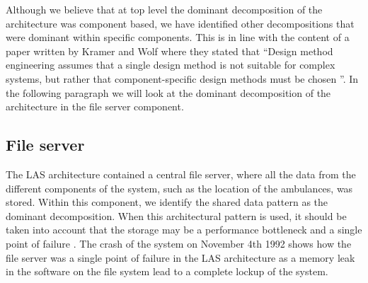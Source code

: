 Although we believe that at top level the dominant decomposition of the architecture was component based,
we have identified other decompositions that were dominant within specific components.
This is in line with the content of a paper written by Kramer and Wolf where they stated that
``Design method engineering assumes that a single design method is not suitable for complex systems,
but rather that component-specific design methods must be chosen ''\autocite[26]{kramer1996succeedings}.
In the following paragraph we will look at the dominant decomposition of the architecture in the file server component.

\subsection*{File server}

The LAS architecture contained a central file server, where all the data from the different components of the system, such as the location of the ambulances, was stored.
Within this component, we identify the shared data pattern as the dominant decomposition.
When this architectural pattern is used, it should be taken into account that the storage may be a performance bottleneck and a single point of failure \autocite[chapter 13]{softArchitInPractice}.
The crash of the system on November 4th 1992 shows how the file server was a single point of failure in the LAS architecture as a memory leak in the software on the file system lead to a complete lockup of the system.